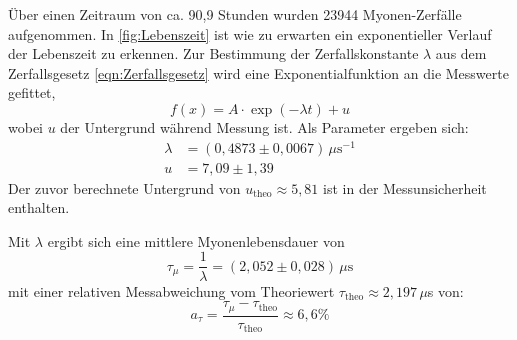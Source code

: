         \FloatBarrier

        Über einen Zeitraum von ca. 90,9 Stunden wurden 23944 Myonen-Zerfälle aufgenommen. In \autoref{fig:Lebenszeit} ist wie zu erwarten ein exponentieller Verlauf der Lebenszeit zu erkennen. Zur Bestimmung der Zerfallskonstante $\lambda$ aus dem Zerfallsgesetz \eqref{eqn:Zerfallsgesetz} wird eine Exponentialfunktion an die Messwerte gefittet,
        \begin{equation*}
            f(x) = A \cdot \exp\left(-\lambda t\right) + u
        \end{equation*}
        wobei $u$ der Untergrund während Messung ist. Als Parameter ergeben sich:
        \begin{align*}
            \lambda &= (0,4873 \pm 0,0067) \, \mu\text{s}^{-1} \\
            u &= 7,09 \pm 1,39
        \end{align*}
        Der zuvor berechnete Untergrund von $u_{\text{theo}} \approx 5,81$ ist in der Messunsicherheit enthalten.

        Mit $\lambda$ ergibt sich eine mittlere Myonenlebensdauer von
        \begin{equation*}
            \tau_{\mu} = \frac{1}{\lambda} = (2,052 \pm 0,028) \, \mu\text{s}
        \end{equation*}
        mit einer relativen Messabweichung vom Theoriewert $\tau_{\text{theo}} \approx 2,197 \, \mu$s \cite{zyla_review_2020} von:
        \begin{equation*}
            a_{\tau} = \frac{\tau_{\mu} - \tau_{\text{theo}}}{\tau_{\text{theo}}} \approx 6,6 \%
        \end{equation*}


















































